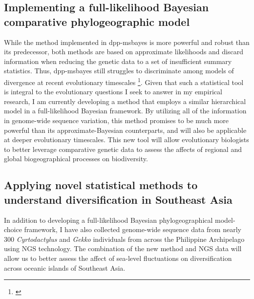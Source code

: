 \subsection*{Implementing a full-likelihood Bayesian comparative
    phylogeographic model}
While the method implemented in dpp-msbayes is more powerful and robust than
its predecessor, both methods are based on approximate likelihoods and discard
information when reducing the genetic data to a set of insufficient summary
statistics.
Thus, dpp-msbayes still struggles to discriminate among models of divergence at
recent evolutionary timescales \footnote{\label{Oaks14dpp}}.
Given that such a statistical tool is integral to the evolutionary questions
I seek to answer in my empirical research,
I am currently developing a method that employs a similar hierarchical model in
a full-likelihood Bayesian framework.
By utilizing all of the information in genome-wide sequence variation, this
method promises to be much more powerful than its approximate-Bayesian
counterparts, and will also be applicable at deeper evolutionary timescales.
This new tool will allow evolutionary biologists to better leverage comparative
genetic data to assess the affects of regional and global biogeographical
processes on biodiversity.

\subsection*{Applying novel statistical methods to understand diversification
    in Southeast Asia}
In addition to developing a full-likelihood Bayesian phylogeographical
model-choice framework, I have also collected genome-wide sequence data from
nearly 300 \emph{Cyrtodactylus} and \emph{Gekko} individuals from across the
Philippine Archipelago using NGS technology.
The combination of the new method and NGS data will allow us to better assess
the affect of sea-level fluctuations on diversification across oceanic islands
of Southeast Asia.

